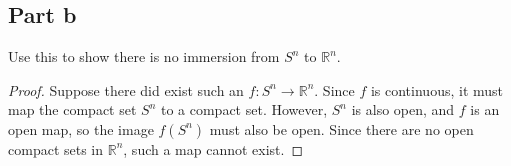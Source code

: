 \documentclass[fontsize=11pt]{scrartcl} %
\numberwithin{equation}{section} %
\numberwithin{figure}{section} %
\numberwithin{table}{section} %
\newcommand{\R}{\mathbb{R}}
\begin{document}
\subsection*{Part b}
Use this to show there is no immersion from $S^n$ to $\R^n$.
\\
\begin{proof}
Suppose there did exist such an $f:S^n\to\R^n$. Since $f$ is continuous, it must
map the compact set $S^n$ to a compact set. However, $S^n$ is also open, and $f$ is an open
map, so the image $f(S^n)$ must also be open. Since there are no open compact sets in $\R^n$,
such a map cannot exist.
\end{proof}
\end{document}
